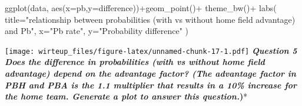 \documentclass[
]{article}
\newenvironment{Shaded}{\begin{snugshade}}{\end{snugshade}}
\newcommand{\AttributeTok}[1]{\textcolor[rgb]{0.77,0.63,0.00}{#1}}
\newcommand{\FunctionTok}[1]{\textcolor[rgb]{0.00,0.00,0.00}{#1}}
\newcommand{\NormalTok}[1]{#1}
\newcommand{\SpecialCharTok}[1]{\textcolor[rgb]{0.00,0.00,0.00}{#1}}
\newcommand{\StringTok}[1]{\textcolor[rgb]{0.31,0.60,0.02}{#1}}
\begin{document}
\begin{Shaded}
\begin{Highlighting}[]
\FunctionTok{ggplot}\NormalTok{(data, }\FunctionTok{aes}\NormalTok{(}\AttributeTok{x=}\NormalTok{pb,}\AttributeTok{y=}\NormalTok{difference))}\SpecialCharTok{+}\FunctionTok{geom\_point}\NormalTok{()}\SpecialCharTok{+}
  \FunctionTok{theme\_bw}\NormalTok{()}\SpecialCharTok{+}
  \FunctionTok{labs}\NormalTok{(}
    \AttributeTok{title=}\StringTok{"relationship between probabilities (with vs without home field advantage) and Pb"}\NormalTok{,}
    \AttributeTok{x=}\StringTok{"Pb rate"}\NormalTok{,}
    \AttributeTok{y=}\StringTok{"Probability difference"}
\NormalTok{  )}
\end{Highlighting}
\end{Shaded}

\texttt{[image: wirteup\_files/figure-latex/unnamed-chunk-17-1.pdf]}
\textbf{\emph{Question 5 Does the difference in probabilities (with vs
without home field advantage) depend on the advantage factor? (The
advantage factor in PBH and PBA is the 1.1 multiplier that results in a
10\% increase for the home team. Generate a plot to answer this
question.})}*
\end{document}
